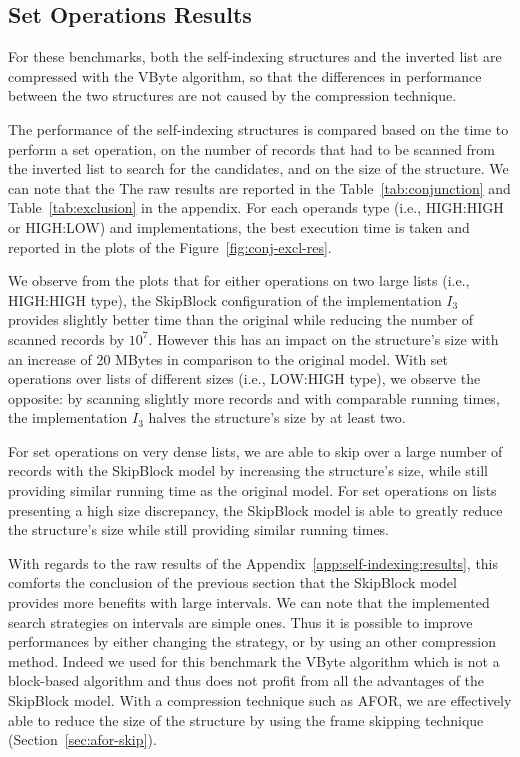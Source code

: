 \subsection{Set Operations Results}
\label{sec:self-indexing-res}

For these benchmarks, both the self-indexing structures and the inverted list
are compressed with the VByte algorithm, so that the differences in
performance between the two structures are not caused by the compression
technique.

The performance of the self-indexing structures is compared based on the time
to perform a set operation, on the number of records that had to be scanned
from the inverted list to search for the candidates, and on the size of the
structure. We can note that the The raw results are reported in the
Table~\ref{tab:conjunction} and Table~\ref{tab:exclusion} in the appendix. For
each operands type (i.e., HIGH:HIGH or HIGH:LOW) and implementations, the best
execution time is taken and reported in the plots of the
Figure~\ref{fig:conj-excl-res}.

We observe from the plots that for either operations on two large lists (i.e.,
HIGH:HIGH type), the SkipBlock configuration of the implementation $I_3$
provides slightly better time than the original while reducing the number of
scanned records by $10^7$. However this has an impact on the structure's size
with an increase of 20 MBytes in comparison to the original model. With set
operations over lists of different sizes (i.e., LOW:HIGH type), we observe the
opposite: by scanning slightly more records and with comparable running times,
the implementation $I_3$ halves the structure's size by at least two.

For set operations on very dense lists, we are able to skip over a large number
of records with the SkipBlock model by increasing the structure's size, while
still providing similar running time as the original model. For set operations
on lists presenting a high size discrepancy, the SkipBlock model is able to
greatly reduce the structure's size while still providing similar running times.

With regards to the raw results of the Appendix~\ref{app:self-indexing:results},
this comforts the conclusion of the previous section that the SkipBlock model
provides more benefits with large intervals. We can note that the implemented
search strategies on intervals are simple ones. Thus it is possible to improve
performances by either changing the strategy, or by using an other compression
method. Indeed we used for this benchmark the VByte algorithm which is not a
block-based algorithm and thus does not profit from all the advantages of the
SkipBlock model. With a compression technique such as AFOR, we are effectively
able to reduce the size of the structure by using the frame skipping technique
(Section~\ref{sec:afor-skip}).

